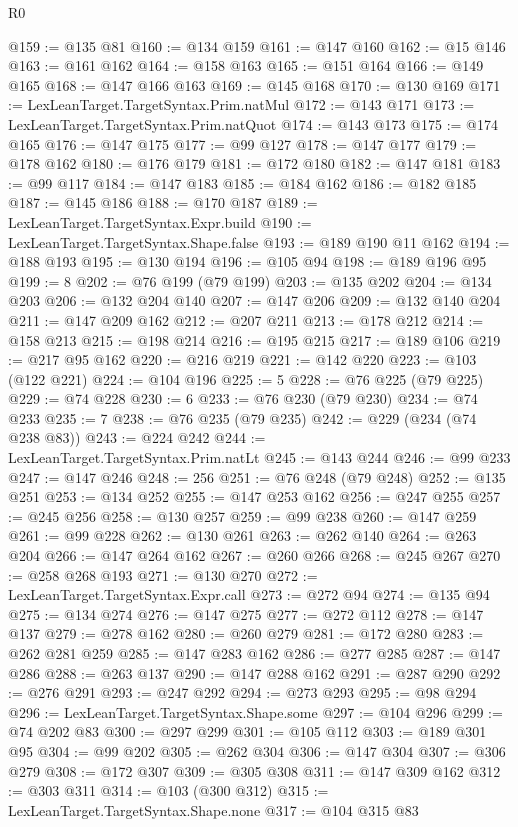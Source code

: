 \begin{lexlean}{R0}
\begin{coremodule}
@159 := @135 @81
@160 := @134 @159
@161 := @147 @160
@162 := @15 @146
@163 := @161 @162
@164 := @158 @163
@165 := @151 @164
@166 := @149 @165
@168 := @147 @166 @163
@169 := @145 @168
@170 := @130 @169
@171 := LexLeanTarget.TargetSyntax.Prim.natMul
@172 := @143 @171
@173 := LexLeanTarget.TargetSyntax.Prim.natQuot
@174 := @143 @173
@175 := @174 @165
@176 := @147 @175
@177 := @99 @127
@178 := @147 @177
@179 := @178 @162
@180 := @176 @179
@181 := @172 @180
@182 := @147 @181
@183 := @99 @117
@184 := @147 @183
@185 := @184 @162
@186 := @182 @185
@187 := @145 @186
@188 := @170 @187
@189 := LexLeanTarget.TargetSyntax.Expr.build
@190 := LexLeanTarget.TargetSyntax.Shape.false
@193 := @189 @190 @11 @162
@194 := @188 @193
@195 := @130 @194
@196 := @105 @94
@198 := @189 @196 @95
@199 := 8
@202 := @76 @199 (@79 @199)
@203 := @135 @202
@204 := @134 @203
@206 := @132 @204 @140
@207 := @147 @206
@209 := @132 @140 @204
@211 := @147 @209 @162
@212 := @207 @211
@213 := @178 @212
@214 := @158 @213
@215 := @198 @214
@216 := @195 @215
@217 := @189 @106
@219 := @217 @95 @162
@220 := @216 @219
@221 := @142 @220
@223 := @103 (@122 @221)
@224 := @104 @196
@225 := 5
@228 := @76 @225 (@79 @225)
@229 := @74 @228
@230 := 6
@233 := @76 @230 (@79 @230)
@234 := @74 @233
@235 := 7
@238 := @76 @235 (@79 @235)
@242 := @229 (@234 (@74 @238 @83))
@243 := @224 @242
@244 := LexLeanTarget.TargetSyntax.Prim.natLt
@245 := @143 @244
@246 := @99 @233
@247 := @147 @246
@248 := 256
@251 := @76 @248 (@79 @248)
@252 := @135 @251
@253 := @134 @252
@255 := @147 @253 @162
@256 := @247 @255
@257 := @245 @256
@258 := @130 @257
@259 := @99 @238
@260 := @147 @259
@261 := @99 @228
@262 := @130 @261
@263 := @262 @140
@264 := @263 @204
@266 := @147 @264 @162
@267 := @260 @266
@268 := @245 @267
@270 := @258 @268 @193
@271 := @130 @270
@272 := LexLeanTarget.TargetSyntax.Expr.call
@273 := @272 @94
@274 := @135 @94
@275 := @134 @274
@276 := @147 @275
@277 := @272 @112
@278 := @147 @137
@279 := @278 @162
@280 := @260 @279
@281 := @172 @280
@283 := @262 @281 @259
@285 := @147 @283 @162
@286 := @277 @285
@287 := @147 @286
@288 := @263 @137
@290 := @147 @288 @162
@291 := @287 @290
@292 := @276 @291
@293 := @247 @292
@294 := @273 @293
@295 := @98 @294
@296 := LexLeanTarget.TargetSyntax.Shape.some
@297 := @104 @296
@299 := @74 @202 @83
@300 := @297 @299
@301 := @105 @112
@303 := @189 @301 @95
@304 := @99 @202
@305 := @262 @304
@306 := @147 @304
@307 := @306 @279
@308 := @172 @307
@309 := @305 @308
@311 := @147 @309 @162
@312 := @303 @311
@314 := @103 (@300 @312)
@315 := LexLeanTarget.TargetSyntax.Shape.none
@317 := @104 @315 @83

\end{coremodule}
\end{lexlean}
